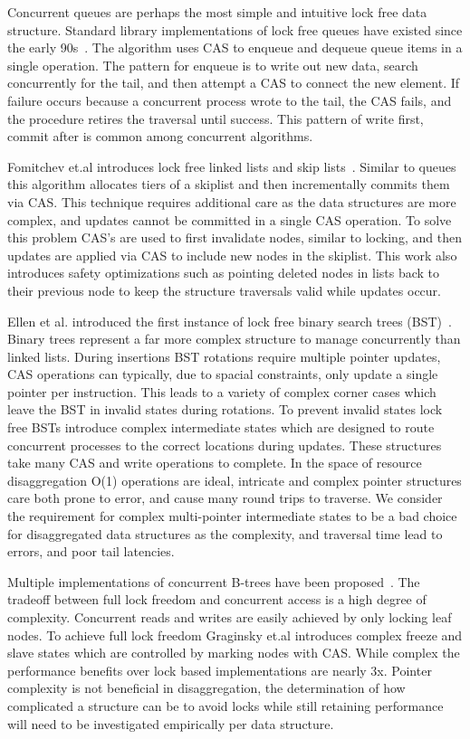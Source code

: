 Concurrent queues are perhaps the most simple and intuitive lock free data
structure. Standard library implementations of lock free queues have existed
since the early 90s~\cite{simple-fast}. The algorithm uses CAS to enqueue and
dequeue queue items in a single operation. The pattern for enqueue is to write
out new data, search concurrently for the tail, and then attempt a CAS to
connect the new element. If failure occurs because a concurrent process wrote to
the tail, the CAS fails, and the procedure retires the traversal until success.
This pattern of write first, commit after is common among concurrent algorithms.

Fomitchev et.al introduces lock free linked lists and skip
lists~\cite{lock-free-skip}. Similar to queues this algorithm allocates tiers of
a skiplist and then incrementally commits them via CAS. This technique requires
additional care as the data structures are more complex, and updates cannot be
committed in a single CAS operation. To solve this problem CAS's are used to
first invalidate nodes, similar to locking, and then updates are applied via CAS
to include new nodes in the skiplist. This work also introduces safety
optimizations such as pointing deleted nodes in lists back to their previous
node to keep the structure traversals valid while updates occur.

Ellen et al. introduced the first instance of lock free binary search trees
(BST)~\cite{non-block-binary}.  Binary trees represent a far more complex
structure to manage concurrently than linked lists. During insertions BST
rotations require multiple pointer updates, CAS operations can typically, due to
spacial constraints, only update a single pointer per instruction. This leads to
a variety of complex corner cases which leave the BST in invalid states during
rotations.  To prevent invalid states lock free BSTs introduce complex
intermediate states which are designed to route concurrent processes to the
correct locations during updates. These structures take many CAS and write
operations to complete. In the space of resource disaggregation O(1) operations
are ideal, intricate and complex pointer structures care both prone to error,
and cause many round trips to traverse. We consider the requirement for complex
multi-pointer intermediate states to be a bad choice for disaggregated data
structures as the complexity, and traversal time lead to errors, and poor tail
latencies.
 
Multiple implementations of concurrent B-trees have been
proposed~\cite{read-concur-btree,lock-free-btree}. The tradeoff between full
lock freedom and concurrent access is a high degree of complexity. Concurrent
reads and writes are easily achieved by only locking leaf nodes. To achieve full
lock freedom Graginsky et.al introduces complex freeze and slave states which
are controlled by marking nodes with CAS. While complex the performance benefits
over lock based implementations are nearly 3x. Pointer complexity is not
beneficial in disaggregation, the determination of how complicated a structure
can be to avoid locks while still retaining performance will need to be
investigated empirically per data structure.

